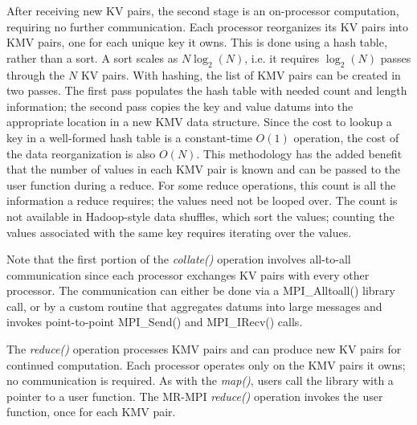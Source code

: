 After receiving new KV pairs, the second stage is an on-processor
computation, requiring no further communication.  Each processor
reorganizes its KV pairs into KMV pairs, one for each unique key it
owns.  This is done using a hash table, rather than a sort.  A sort
scales as $N\log_2(N)$, i.e. it requires $\log_2(N)$ passes through
the $N$ KV pairs.  With hashing, the list of KMV pairs can be created
in two passes.  The first pass populates the hash table with needed
count and length information; the second pass copies the key and value
datums into the appropriate location in a new KMV data structure.
Since the cost to lookup a key in a well-formed hash table is a
constant-time $O(1)$ operation, the cost of the data reorganization is
also $O(N)$.  This methodology has the added benefit that the number
of values in each KMV pair is known and can be passed to the user
function during a reduce.  For some reduce operations, this count is
all the information a reduce requires; the values need not be looped
over.  The count is not available in Hadoop-style data shuffles, which
sort the values; counting the values associated with the same key
requires iterating over the values.

Note that the first portion of the {\it collate()} operation involves
all-to-all communication since each processor exchanges KV pairs with
every other processor.  The communication can either be done via a
MPI\_Alltoall() library call, or by a custom routine that aggregates
datums into large messages and invokes point-to-point MPI\_Send() and
MPI\_IRecv() calls.

The {\it reduce()} operation processes KMV pairs and can produce new
KV pairs for continued computation.  Each processor operates only on
the KMV pairs it owns; no communication is required.  As with the {\it
map()}, users call the library with a pointer to a user function.  The
MR-MPI {\it reduce()} operation invokes the user function, once for
each KMV pair.

